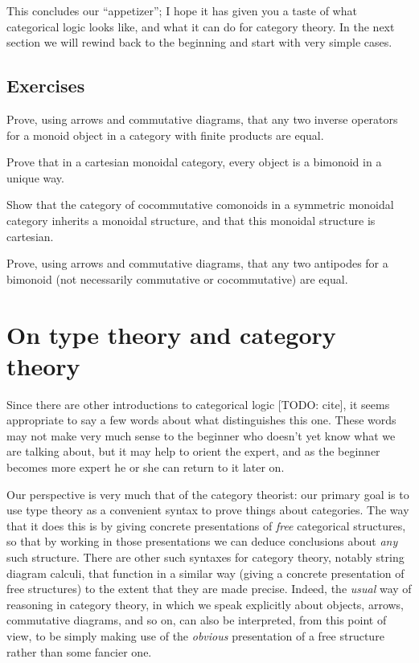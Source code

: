 \documentclass{book}
\begin{document}
This concludes our ``appetizer''; I hope it has given you a taste of what categorical logic looks like, and what it can do for category theory.
In the next section we will rewind back to the beginning and start with very simple cases.

\subsection*{Exercises}

\begin{ex}\label{ex:fp-inv-uniq}
  Prove, using arrows and commutative diagrams, that any two inverse operators for a monoid object in a category with finite products are equal.
\end{ex}

\begin{ex}\label{ex:cartmon-bimon-uniq}
  Prove that in a cartesian monoidal category, every object is a bimonoid in a unique way.
\end{ex}

\begin{ex}\label{ex:ccmon-cart}
  Show that the category of cocommutative comonoids in a symmetric monoidal category inherits a monoidal structure, and that this monoidal structure is cartesian.
\end{ex}

\begin{ex}\label{ex:antipode}
  Prove, using arrows and commutative diagrams, that any two antipodes for a bimonoid (not necessarily commutative or cocommutative) are equal.
\end{ex}


\section{On type theory and category theory}
\label{sec:generalities}

Since there are other introductions to categorical logic [TODO: cite], it seems appropriate to say a few words about what distinguishes this one.
These words may not make very much sense to the beginner who doesn't yet know what we are talking about, but it may help to orient the expert, and as the beginner becomes more expert he or she can return to it later on.

Our perspective is very much that of the category theorist: our primary goal is to use type theory as a convenient syntax to prove things about categories.
The way that it does this is by giving concrete presentations of \emph{free} categorical structures, so that by working in those presentations we can deduce conclusions about \emph{any} such structure.
There are other such syntaxes for category theory, notably string diagram calculi, that function in a similar way (giving a concrete presentation of free structures) to the extent that they are made precise.
Indeed, the \emph{usual} way of reasoning in category theory, in which we speak explicitly about objects, arrows, commutative diagrams, and so on, can also be interpreted, from this point of view, to be simply making use of the \emph{obvious} presentation of a free structure rather than some fancier one.
\end{document}
